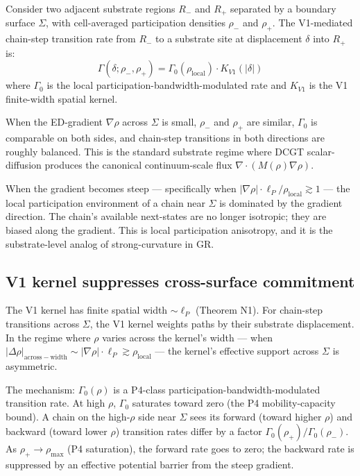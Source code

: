 \documentclass[11pt,a4paper]{article}
\begin{document}
Consider two adjacent substrate regions $R_-$ and $R_+$ separated by a boundary surface $\Sigma$, with cell-averaged participation densities $\rho_-$ and $\rho_+$. The V1-mediated chain-step transition rate from $R_-$ to a substrate site at displacement $\delta$ into $R_+$ is:
\[
\Gamma(\delta; \rho_-, \rho_+) = \Gamma_0(\rho_{\mathrm{local}}) \cdot K_{V1}(|\delta|)
\]
where $\Gamma_0$ is the local participation-bandwidth-modulated rate and $K_{V1}$ is the V1 finite-width spatial kernel.

When the ED-gradient $\nabla\rho$ across $\Sigma$ is small, $\rho_-$ and $\rho_+$ are similar, $\Gamma_0$ is comparable on both sides, and chain-step transitions in both directions are roughly balanced. This is the standard substrate regime where DCGT scalar-diffusion produces the canonical continuum-scale flux $\nabla\cdot(M(\rho)\nabla\rho)$.

When the gradient becomes steep --- specifically when $|\nabla\rho|\cdot\ell_P/\rho_{\mathrm{local}} \gtrsim 1$ --- the local participation environment of a chain near $\Sigma$ is dominated by the gradient direction. The chain's available next-states are no longer isotropic; they are biased along the gradient. This is local participation anisotropy, and it is the substrate-level analog of strong-curvature in GR.

\subsection{V1 kernel suppresses cross-surface commitment}

The V1 kernel has finite spatial width $\sim \ell_P$ (Theorem N1). For chain-step transitions across $\Sigma$, the V1 kernel weights paths by their substrate displacement. In the regime where $\rho$ varies across the kernel's width --- when $|\Delta\rho|_{\mathrm{across-width}} \sim |\nabla\rho|\cdot\ell_P \gtrsim \rho_{\mathrm{local}}$ --- the kernel's effective support across $\Sigma$ is asymmetric.

The mechanism: $\Gamma_0(\rho)$ is a P4-class participation-bandwidth-modulated transition rate. At high $\rho$, $\Gamma_0$ saturates toward zero (the P4 mobility-capacity bound). A chain on the high-$\rho$ side near $\Sigma$ sees its forward (toward higher $\rho$) and backward (toward lower $\rho$) transition rates differ by a factor $\Gamma_0(\rho_+)/\Gamma_0(\rho_-)$. As $\rho_+ \to \rho_{\mathrm{max}}$ (P4 saturation), the forward rate goes to zero; the backward rate is suppressed by an effective potential barrier from the steep gradient.
\end{document}
